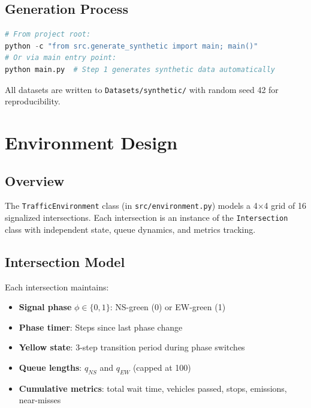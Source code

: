 \documentclass[12pt, a4paper]{article}
\begin{document}
\subsection{Generation Process}

\begin{lstlisting}[language=Python, caption={Running synthetic data generation}]
# From project root:
python -c "from src.generate_synthetic import main; main()"
# Or via main entry point:
python main.py  # Step 1 generates synthetic data automatically
\end{lstlisting}

All datasets are written to \texttt{Datasets/synthetic/} with random seed 42 for reproducibility.

\section{Environment Design}

\subsection{Overview}

The \texttt{TrafficEnvironment} class (in \texttt{src/environment.py}) models a 4$\times$4 grid of 16 signalized intersections. Each intersection is an instance of the \texttt{Intersection} class with independent state, queue dynamics, and metrics tracking.

\subsection{Intersection Model}

Each intersection maintains:
\begin{itemize}[nosep]
    \item \textbf{Signal phase} $\phi \in \{0, 1\}$: NS-green (0) or EW-green (1)
    \item \textbf{Phase timer}: Steps since last phase change
    \item \textbf{Yellow state}: 3-step transition period during phase switches
    \item \textbf{Queue lengths}: $q_{NS}$ and $q_{EW}$ (capped at 100)
    \item \textbf{Cumulative metrics}: total wait time, vehicles passed, stops, emissions, near-misses
\end{itemize}
\end{document}
